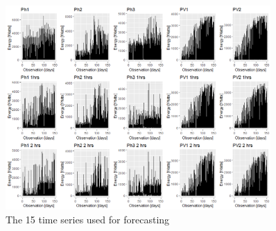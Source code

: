 \documentclass[12pt,a4paper,titlepage]{report}
\begin{document}
%
%
%
%
%
%
\begin{figure}[h]
    \centering
    \includegraphics[width=0.9\textwidth]{dfulltimeseries.png}
    \caption{The 15 time series used for forecasting}
    \label{fulltimeseriesfigure}
\end{figure}
\end{document}
